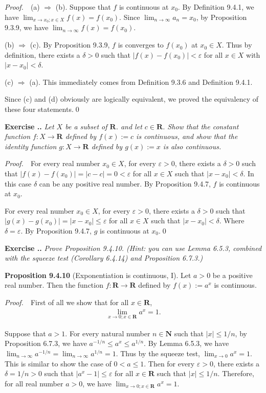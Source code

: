 \documentclass{book}
\newcommand{\pff}{\vspace{.25em}\noindent\emph{Proof.}~~}
\newcommand{\titl}[1]{\noindent\textbf{#1}}
\newcounter{Exercise}[section]
\renewcommand{\theExercise}{\thesection.\arabic{Exercise}.}
\newcommand{\new}{\vspace{1.5em}\noindent\textbf{{Exercise \stepcounter{Exercise}\textbf{\theExercise}}} }
\begin{document}
\pff (a) $\Rightarrow$ (b). Suppose that $f$ is continuous at $x_0$. By Definition 9.4.1, we have $\lim_{x\to x_0;x\in X}f(x)=f(x_0)$. Since $\lim_{n\to\infty}a_n=x_0$, by Proposition 9.3.9, we have $\lim_{n\to\infty}f(x)=f(x_0)$.

(b) $\Rightarrow$ (c). By Proposition 9.3.9, $f$ is converges to $f(x_0)$ at $x_0\in X$. Thus by definition, there exists a $\delta>0$ such that $|f(x)-f(x_0)|<\varepsilon$ for all $x\in X$ with $|x-x_0|<\delta$.

(c) $\Rightarrow$ (a). This immediately comes from Definition 9.3.6 and Definition 9.4.1.

Since (c) and (d) obviously are logically equivalent, we proved the equivalency of these four statements.\qed

\new\emph{Let $X$ be a subset of $\mathbf{R}$. and let $c\in\mathbf{R}$. Show that the constant function $f:X\to\mathbf{R}$ defined by $f(x):=c$ is continuous, and show that the identity function $g:X\to\mathbf{R}$ defined by $g(x):=x$ is also continuous.}

\pff For every real number $x_0\in X$, for every $\varepsilon>0$, there exists a $\delta>0$ such that $|f(x)-f(x_0)|=|c-c|=0<\varepsilon$ for all $x\in X$ such that $|x-x_0|<\delta$. In this case $\delta$ can be any positive real number. By Proposition 9.4.7, $f$ is continuous at $x_0$.

For every real number $x_0\in X$, for every $\varepsilon>0$, there exists a $\delta>0$ such that $|g(x)-g(x_0)|=|x-x_0|\leq\varepsilon$ for all $x\in X$ such that $|x-x_0|<\delta$. Where $\delta=\varepsilon$. By Proposition 9.4.7, $g$ is continuous at $x_0$.\qed

\new\emph{Prove Proposition 9.4.10. (Hint: you can use Lemma 6.5.3, combined with the squeeze test (Corollary 6.4.14) and Proposition 6.7.3.)}

\begin{framed}
\titl{Proposition 9.4.10} (Exponentiation is continuous, I). Let $a>0$ be a positive real number. Then the function $f:\mathbf{R}\to\mathbf{R}$ defined by $f(x):=a^x$ is continuous.
\end{framed}

\pff First of all we show that for all $x\in\mathbf{R}$,
    \begin{align*}
        \lim_{x\to 0;x\in \mathbf{R}}a^x=1.
    \end{align*}

Suppose that $a>1$. For every natural number $n\in\mathbf{N}$ such that $|x|\leq 1/n$, by Proposition 6.7.3, we have $a^{-1/n}\leq a^x\leq a^{1/n}$. By Lemma 6.5.3, we have $\lim_{n\to\infty}a^{-1/n}=\lim_{n\to\infty}a^{1/n}=1$. Thus by the squeeze test, $\lim_{x\to 0}a^x=1$. This is similar to show the case of $0<a\leq 1$. Then for every $\varepsilon>0$, there exists a $\delta=1/n>0$ such that $|a^x-1|\leq\varepsilon$ for all $x\in\mathbf{R}$ such that $|x|\leq 1/n$. Therefore, for all real number $a>0$, we have $\lim_{x\to 0;x\in \mathbf{R}}a^x=1$.
\end{document}

